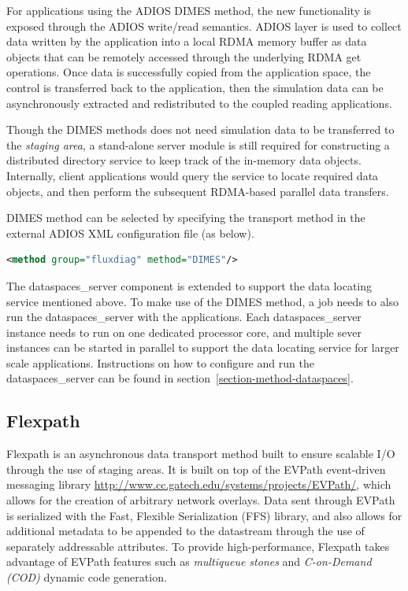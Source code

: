 For applications using the ADIOS DIMES method, the new functionality is exposed 
through the ADIOS write/read semantics. ADIOS layer is used to collect data written by 
the application into a local RDMA memory buffer as data objects that can 
be remotely accessed through the underlying RDMA get operations. Once data is 
successfully copied from the application space, the control is transferred back to the 
application, then the simulation data can be asynchronously extracted and redistributed 
to the coupled reading applications. 

Though the DIMES methods does not need simulation data to be transferred to the 
\emph{staging area}, a stand-alone server module is still required for constructing a 
distributed directory service to keep track of the in-memory data objects. Internally, client 
applications would query the service to locate required data objects, and then perform 
the subsequent RDMA-based parallel data transfers. 

DIMES method can be selected by specifying the transport method in the external 
ADIOS XML configuration file (as below).

\begin{lstlisting}[language=XML, caption=Select DIMES as a transport method in the configuration file example.]
<method group="fluxdiag" method="DIMES"/>
\end{lstlisting}

The dataspaces\_server component is extended to support the data locating service 
mentioned above. To make use of the DIMES method, a job needs to also run the 
dataspaces\_server with the applications. Each dataspaces\_server instance 
needs to run on one dedicated processor core, and multiple sever instances can be 
started in parallel to support the data locating service for larger scale applications. 
Instructions on how to configure and run the dataspaces\_server can be found in 
section~\ref{section-method-dataspaces}.


\subsection{Flexpath}
\label{section-method-flexpath}
Flexpath is an asynchronous data transport method built to ensure scalable I/O through the use of staging areas. It is built on top of the EVPath event-driven messaging library \url{http://www.cc.gatech.edu/systems/projects/EVPath/}, which allows for the creation of arbitrary network overlays. Data sent through EVPath is serialized with the Fast, Flexible Serialization (FFS) library, and also allows for additional metadata to be appended to the datastream through the use of separately addressable attributes. To provide high-performance, Flexpath takes advantage of EVPath features such as {\em multiqueue stones} and {\em C-on-Demand (COD)} dynamic code generation.

